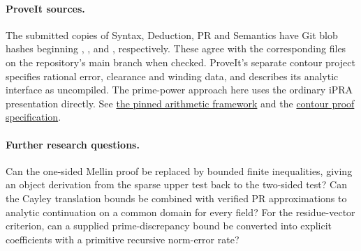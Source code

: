 \paragraph{ProveIt sources.}
The submitted copies of Syntax, Deduction, PR and Semantics have Git blob hashes beginning , ,  and , respectively. These agree with the corresponding files on the repository's main branch when checked. ProveIt's separate contour project specifies rational error, clearance and winding data, and describes its analytic interface as uncompiled. The prime-power approach here uses the ordinary iPRA presentation directly. See \href{https://github.com/VladimirReshetnikov/ProveIt/tree/ce0e3ceaf41a83e653857e5f60e0460733cc230c/Logic/PrimitiveRecursiveArithmetic/ConciseIPRA}{the pinned arithmetic framework} and the \href{https://github.com/VladimirReshetnikov/ProveIt/blob/main/Logic/PrimitiveRecursiveArithmetic/docs/proofs/analytic-number-theory/zeta_zeros_ipra_2026-11-15/lean/ObjectTargets.lean}{contour proof specification}.



\paragraph{Further research questions.}
Can the one-sided Mellin proof be replaced by bounded finite inequalities, giving an object derivation from the sparse upper test back to the two-sided test? Can the Cayley translation bounds be combined with verified PR approximations to analytic continuation on a common domain for every field? For the residue-vector criterion, can a supplied prime-discrepancy bound be converted into explicit coefficients with a primitive recursive norm-error rate? 
